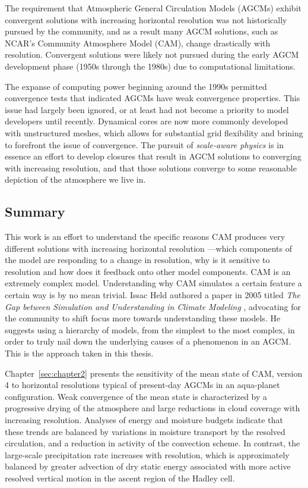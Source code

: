 The requirement that Atmospheric General Circulation Models (AGCMs) exhibit convergent solutions with increasing horizontal resolution was not historically pursued by the community, and as a result many AGCM solutions, such as NCAR's Community Atmosphere Model (CAM), change drastically with resolution. Convergent solutions were likely not pursued during the early AGCM development phase (1950s through the 1980s) due to computational limitations. 

The expanse of computing power beginning around the 1990s permitted convergence tests that indicated AGCMs have weak convergence properties. This issue had largely been ignored, or at least had not become a priority to model developers until recently. Dynamical cores are now more commonly developed with unstructured meshes, which allows for substantial grid flexibility and brining to forefront the issue of convergence. The pursuit of {\em{scale-aware physics}} is in essence an effort to develop closures that result in AGCM solutions to converging with increasing resolution, and that those solutions converge to some reasonable depiction of the atmosphere we live in.

\subsection{Summary}

This work is an effort to understand the specific reasons CAM produces very different solutions with increasing horizontal resolution ---which components of the model are responding to a change in resolution, why is it sensitive to resolution and how does it feedback onto other model components. CAM is an extremely complex model. Understanding why CAM simulates a certain feature a certain way is by no mean trivial. Issac Held authored a paper in 2005 titled {\em{The Gap between Simulation and Understanding in Climate Modeling}} \citep{H2005BAMS}, advocating for the community to shift focus more towards understanding these models. He suggests using a hierarchy of models, from the simplest to the most complex, in order to truly nail down the underlying causes of a phenomenon in an AGCM. This is the approach taken in this thesis.

Chapter~\ref{sec:chapter2} presents the sensitivity of the mean state of CAM, version 4 to horizontal resolutions typical of present-day AGCMs in an aqua-planet configuration. Weak convergence of the mean state is characterized by a progressive drying of the atmosphere and large reductions in cloud coverage with increasing resolution. Analyses of energy and moisture budgets indicate that these trends are balanced by variations in moisture transport by the resolved circulation, and a reduction in activity of the convection scheme. In contrast, the large-scale precipitation rate increases with resolution, which is approximately balanced by greater advection of dry static energy associated with more active resolved vertical motion in the ascent region of the Hadley cell.

